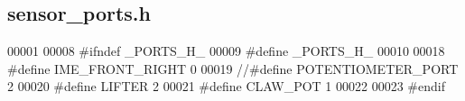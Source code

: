 \subsection{sensor\+\_\+ports.\+h}
\label{sensor__ports_8h_source}

\begin{DoxyCode}
00001 
00008 \textcolor{preprocessor}{#ifndef \_PORTS\_H\_}
00009 \textcolor{preprocessor}{#define \_PORTS\_H\_}
00010 
00018 \textcolor{preprocessor}{#define IME\_FRONT\_RIGHT 0}
00019 \textcolor{comment}{//#define POTENTIOMETER\_PORT 2}
00020 \textcolor{preprocessor}{#define LIFTER 2}
00021 \textcolor{preprocessor}{#define CLAW\_POT 1}
00022 
00023 \textcolor{preprocessor}{#endif}
\end{DoxyCode}
